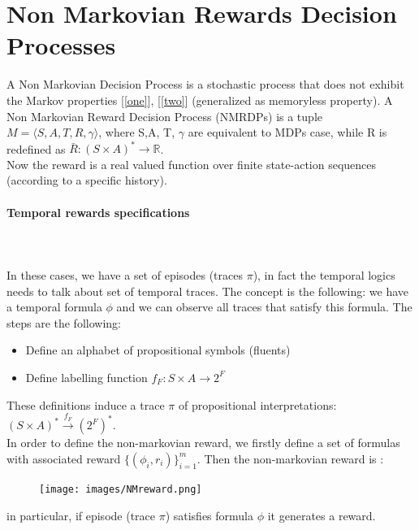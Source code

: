 \documentclass{article}
\begin{document}
\section{Non Markovian Rewards Decision Processes}
A Non Markovian  Decision Process is a stochastic process that does not exhibit the Markov properties [\ref{one}],
[\ref{two}] (generalized as  memoryless property).
A Non Markovian Reward Decision Process (NMRDPs) is a tuple $M= \langle S, A, T, R, \gamma \rangle$, where S,A, T, $\gamma$ are equivalent to MDPs case, while R is redefined as $\bar{R}:(S\times A)^* \longrightarrow \mathbb{R}$.\\
Now  the reward  is a real valued function over finite state-action sequences (according to a specific history).


\paragraph{Temporal rewards specifications}
\noindent\\\\
In these cases, we have a set of episodes (traces $\pi$), in fact the temporal logics needs to talk about set of temporal traces.
The concept is the following: we have a temporal formula $\phi$ and we can observe all traces that satisfy this formula.
The steps are the following:
\begin{itemize}
\item Define an alphabet of propositional symbols (fluents)
\item Define labelling function $f_F:S\times A \longrightarrow 2^F$
\end{itemize}
\noindent
These definitions induce a trace $\pi$ of propositional interpretations:\\ $ (S\times A)^*\xrightarrow{f_F}  (2^F)^*$.\\
In order to define the non-markovian reward, we firstly define a set of formulas with associated reward $\{(\phi_i,r_i)\}_{i=1} ^m$.
Then  the non-markovian reward is :\\

\begin{figure}[h]
   \centering
\texttt{[image: images/NMreward.png]}\\
\end{figure}

\noindent
in particular, if episode (trace $\pi$) satisfies formula $\phi$ it generates a reward.
\end{document}
